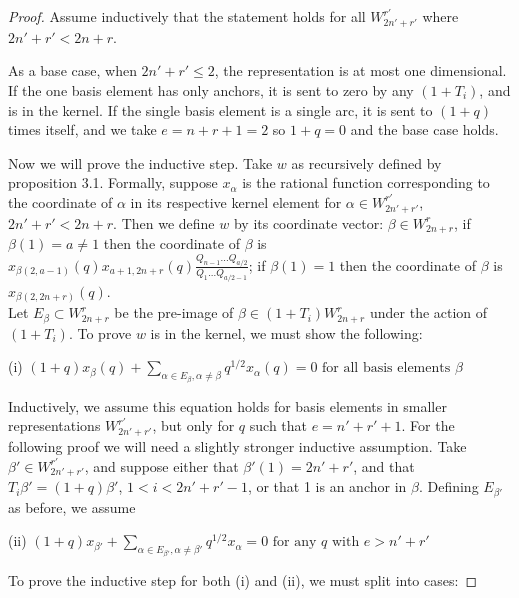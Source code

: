\documentclass{amsart}
\begin{document}
\begin{proof}
	
	Assume inductively that the statement holds for all $W_{2n'+r'}^{r'}$ where $2n'+r'<2n+r$.
	
	As a base case, when $2n'+r'\leq 2$, the representation is at most one dimensional. If the one basis element has only anchors, it is sent to zero by any $(1+T_i)$, and is in the kernel. If the single basis element is a single arc, it is sent to $(1+q)$ times itself, and we take $e=n+r+1=2$ so $1+q=0$ and the base case holds.
	
	\vspace{5mm}
	Now we will prove the inductive step. Take $w$ as recursively defined by proposition 3.1. Formally, suppose $x_\alpha$ is the rational function corresponding to the coordinate of $\alpha$ in its respective kernel element for $\alpha\in W_{2n'+r'}^{r'}$, $2n'+r'<2n+r$. Then we define $w$ by its coordinate vector: $\beta\in W_{2n+r}^r$, if $\beta(1)=a\not=1$ then the coordinate of $\beta$ is $x_{\beta(2,a-1)}(q)x_{a+1,2n+r}(q)\frac{Q_{n-1}...Q_{a/2}}{Q_1...Q_{a/2-1}}$; if $\beta(1)=1$ then the coordinate of $\beta$ is $x_{\beta(2,2n+r)}(q)$. 
	\\
	
	Let $E_\beta\subset W_{2n+r}^r$ be the pre-image of $\beta\in (1+T_i)W_{2n+r}^r$ under the action of $(1+T_i)$. To prove $w$ is in the kernel, we must show the following: 
	\begin{center}
	(i) $(1+q)x_\beta(q)+\sum_{\alpha\in E_\beta,\alpha\not=\beta}q^{1/2}x_\alpha(q)=0\text{ for all basis elements }\beta$
	\end{center}
	Inductively, we assume this equation holds for basis elements in smaller representations $W_{2n'+r'}^{r'}$, but only for $q$ such that $e=n'+r'+1$. For the following proof we will need a slightly stronger inductive assumption. Take $\beta'\in W_{2n'+r'}^{r'}$, and suppose either that $\beta'(1)=2n'+r'$, and that $T_i\beta'=(1+q)\beta'$, $1<i<2n'+r'-1$, or that 1 is an anchor in $\beta$. Defining $E_{\beta'}$ as before, we assume
	
	\begin{center}
		(ii) $(1+q)x_{\beta'}+\sum_{\alpha\in E_{\beta'},\alpha\not=\beta'}q^{1/2}x_\alpha=0\text{ for any } q \text{ with }e>n'+r'$
	\end{center}
	
	\vspace{5mm}
	To prove the inductive step for both (i) and (ii), we must split into cases:
	

\end{proof}
\end{document}
